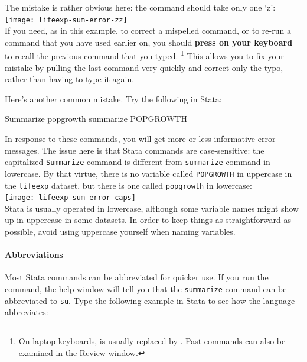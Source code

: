 		The mistake is rather obvious here: the  command should take only one `z':\\[1em]%
		
		\texttt{[image: lifeexp-sum-error-zz]}\\[1em]
		
		If you need, as in this example, to correct a mispelled command, or to re-run a command that you have used earlier on, you should \textbf{press  on your keyboard} to recall the previous command that you typed.%
		\footnote{On laptop keyboards,  is usually replaced by . Past commands can also be examined in the Review window.} %
		This allows you to fix your mistake by pulling the last command very quickly and correct only the typo, rather than having to type it again.%

		Here's another common mistake. Try the following in Stata:%
		
		\begin{docspec}
			Summarize popgrowth
			summarize POPGROWTH
		\end{docspec}

		In response to these commands, you will get more or less informative error messages. The issue here is that Stata commands are case-sensitive: the capitalized \texttt{Summarize} command is different from \texttt{summarize} command in lowercase. By that virtue, there is no variable called \texttt{POPGROWTH} in uppercase in the \texttt{lifeexp} dataset, but there is one called \texttt{popgrowth} in lowercase:\\[1em]%

		\texttt{[image: lifeexp-sum-error-caps]}\\[1em]
		
		Stata is usually operated in lowercase, although some variable names might show up in uppercase in some datasets. In order to keep things as straightforward as possible, avoid using uppercase yourself when naming variables.%
		
		\paragraph{Abbreviations}%

		Most Stata commands can be abbreviated for quicker use. If you run the  command, the help window will tell you that the \texttt{\underline{su}mmarize} command can be abbreviated to \texttt{su}. Type the following example in Stata to see how the language abbreviates:%
    
